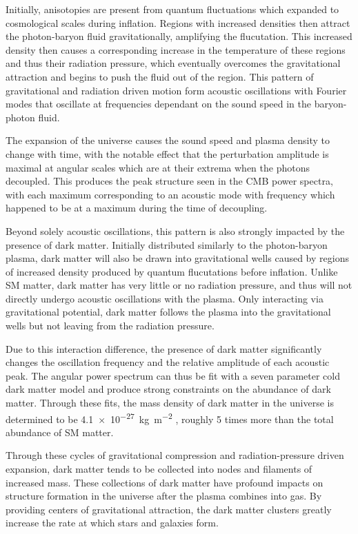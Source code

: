 Initially, anisotopies are present from quantum fluctuations which expanded to cosmological scales during inflation.
Regions with increased densities then attract the photon-baryon fluid gravitationally, amplifying the flucutation.
This increased density then causes a corresponding increase in the temperature of these regions and thus their radiation pressure, which eventually overcomes the gravitational attraction and begins to push the fluid out of the region. 
This pattern of gravitational and radiation driven motion form acoustic oscillations with Fourier modes that oscillate at frequencies dependant on the sound speed in the baryon-photon fluid.

The expansion of the universe causes the sound speed and plasma density to change with time, with the notable effect that the perturbation amplitude is maximal at angular scales which are at their extrema when the photons decoupled. 
This produces the peak structure seen in the CMB power spectra, with each maximum corresponding to an acoustic mode with frequency which happened to be at a maximum during the time of decoupling.

Beyond solely acoustic oscillations, this pattern is also strongly impacted by the presence of dark matter.
Initially distributed similarly to the photon-baryon plasma, dark matter will also be drawn into gravitational wells caused by regions of increased density produced by quantum flucutations before inflation.
Unlike SM matter, dark matter has very little or no radiation pressure, and thus will not directly undergo acoustic oscillations with the plasma. 
Only interacting via gravitational potential, dark matter follows the plasma into the gravitational wells but not leaving from the radiation pressure. 

Due to this interaction difference, the presence of dark matter significantly changes the oscillation frequency and the relative amplitude of each acoustic peak.
The angular power spectrum can thus be fit with a seven parameter cold dark matter model and produce strong constraints on the abundance of dark matter.
Through these fits, the mass density of dark matter in the universe is determined to be \SI{4.1e-27}{\kilo\gram\per\meter\squared} \cite{PlanckCMB}, roughly 5 times more than the total abundance of SM matter.

Through these cycles of gravitational compression and radiation-pressure driven expansion, dark matter tends to be collected into nodes and filaments of increased mass. 
These collections of dark matter have profound impacts on structure formation in the universe after the plasma combines into gas.
By providing centers of gravitational attraction, the dark matter clusters greatly increase the rate at which stars and galaxies form.

